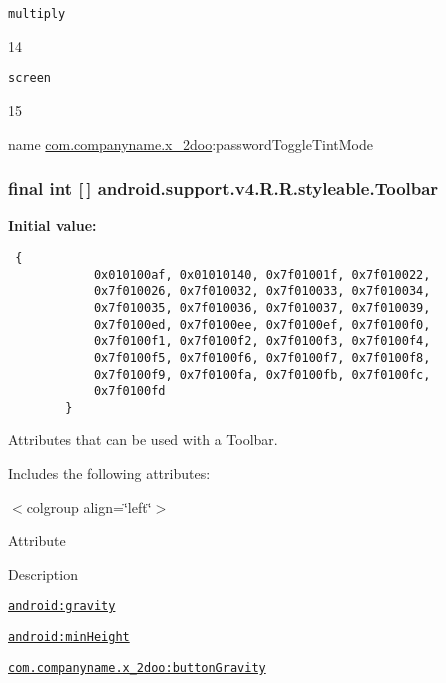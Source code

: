 {\tt multiply}

14

{\tt screen}

15

name \hyperlink{namespacecom_1_1companyname_1_1x__2doo}{com.companyname.x\_\-2doo}:passwordToggleTintMode \hypertarget{classandroid_1_1support_1_1v4_1_1_r_1_1styleable_0646d71cfbd4a8645c7d805b33e1c574}{
\subsubsection[{Toolbar}]{\setlength{\rightskip}{0pt plus 5cm}final int \mbox{[}$\,$\mbox{]} android.support.v4.R.R.styleable.Toolbar}}
\label{classandroid_1_1support_1_1v4_1_1_r_1_1styleable_0646d71cfbd4a8645c7d805b33e1c574}


\textbf{Initial value:}

\begin{Code}\begin{verbatim} {
            0x010100af, 0x01010140, 0x7f01001f, 0x7f010022,
            0x7f010026, 0x7f010032, 0x7f010033, 0x7f010034,
            0x7f010035, 0x7f010036, 0x7f010037, 0x7f010039,
            0x7f0100ed, 0x7f0100ee, 0x7f0100ef, 0x7f0100f0,
            0x7f0100f1, 0x7f0100f2, 0x7f0100f3, 0x7f0100f4,
            0x7f0100f5, 0x7f0100f6, 0x7f0100f7, 0x7f0100f8,
            0x7f0100f9, 0x7f0100fa, 0x7f0100fb, 0x7f0100fc,
            0x7f0100fd
        }
\end{verbatim}
\end{Code}
Attributes that can be used with a Toolbar. 

Includes the following attributes: \begin{TabularC}{0}
\hline
\end{TabularC}
$<$colgroup align=\char`\"{}left\char`\"{}$>$ 

Attribute

Description 

{\tt \hyperlink{classandroid_1_1support_1_1v4_1_1_r_1_1styleable_c8fd7f49fc578cf34e84a402ac885942}{android:gravity}}

{\tt \hyperlink{classandroid_1_1support_1_1v4_1_1_r_1_1styleable_66c75941c3656f61bf62178c80516261}{android:minHeight}}

{\tt \hyperlink{classandroid_1_1support_1_1v4_1_1_r_1_1styleable_5280809e355d936bf33f4570e3e220a3}{com.companyname.x\_\-2doo:buttonGravity}}

